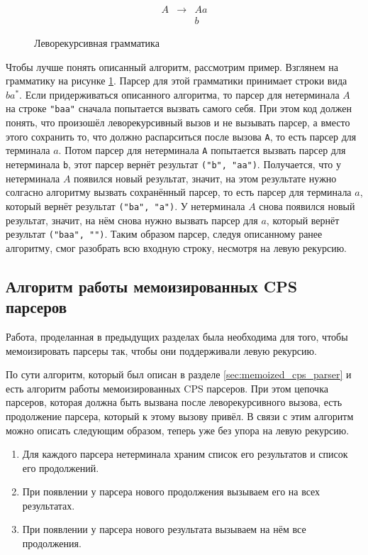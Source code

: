 \documentclass[times]{itmo-student-thesis}
\begin{document}
\begin{figure}[!h]
  \caption{Леворекурсивная грамматика}\label{leftrec_grammar_cps}
  \[
      \begin{array}{lll}
          A & \to & Aa \\
            &     & b
      \end{array}
  \]
\end{figure}

Чтобы лучше понять описанный алгоритм, рассмотрим пример. Взглянем на грамматику на рисунке \ref{leftrec_grammar_cps}.
Парсер для этой грамматики принимает строки вида $ba^*$. Если придерживаться описанного алгоритма, то
парсер для нетерминала $A$ на строке \lstinline{"baa"} сначала попытается вызвать самого себя.
При этом код должен понять, что произошёл леворекурсивный вызов и не вызывать парсер, а вместо этого сохранить то, что
должно распарситься после вызова \lstinline{A}, то есть парсер для терминала $a$. Потом
парсер для нетерминала \lstinline{A} попытается вызвать парсер для нетерминала \lstinline{b}, этот парсер вернёт результат
\lstinline{("b", "aa")}. Получается, что у нетерминала $A$ появился новый результат, значит, на этом
результате нужно солгасно алгоритму вызвать сохранённый парсер, то есть парсер для терминала $a$,
который вернёт результат \lstinline{("ba", "a")}. У нетерминала $A$ снова появился новый результат,
значит, на нём снова нужно вызвать парсер для $a$, который вернёт результат \lstinline{("baa", "")}.
Таким образом парсер, следуя описанному ранее алгоритму, смог разобрать всю входную строку, несмотря на левую рекурсию.

\subsection{Алгоритм работы мемоизированных CPS парсеров}\label{sec:cps_algorithm}

Работа, проделанная в предыдущих разделах была необходима для того, чтобы мемоизировать парсеры так, чтобы они поддерживали
левую рекурсию. 

По сути алгоритм, который был описан в разделе \ref{sec:memoized_cps_parser} и есть алгоритм работы мемоизированных CPS 
парсеров. При этом цепочка парсеров, которая должна быть вызвана после леворекурсивного вызова, есть продолжение парсера, 
который к этому вызову привёл. В связи с этим алгоритм можно описать следующим образом, теперь уже без упора на левую рекурсию.
\begin{enumerate}
    \item Для каждого парсера нетерминала храним список его результатов и список его продолжений.
    \item При появлении у парсера нового продолжения вызываем его на всех результатах.
    \item При появлении у парсера нового результата вызываем на нём все продолжения.
\end{enumerate}
\end{document}
